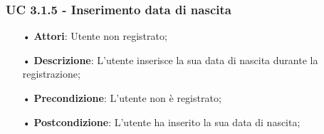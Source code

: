 \subsubsection{UC 3.1.5 - Inserimento data di nascita}
\begin{itemize}
	\item[•]\textbf{Attori}: Utente non registrato;
	\item[•]\textbf{Descrizione}: L’utente inserisce la sua data di nascita durante la registrazione;
	\item[•]\textbf{Precondizione}: L’utente non è registrato;
	\item[•]\textbf{Postcondizione}: L’utente ha inserito la sua data di nascita;
\end{itemize}
